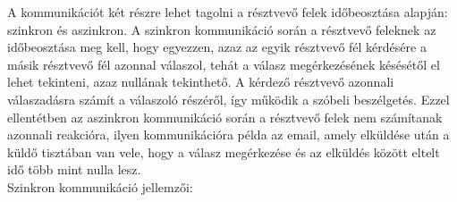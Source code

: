 
A kommunikációt két részre lehet tagolni a résztvevő felek időbeosztása alapján: szinkron és aszinkron. A szinkron kommunikáció során a résztvevő feleknek az időbeosztása meg kell, hogy egyezzen, azaz az egyik résztvevő fél kérdésére a másik résztvevő fél azonnal válaszol, tehát a válasz megérkezésének késésétől el lehet tekinteni, azaz nullának tekinthető. A kérdező résztvevő azonnali válaszadásra számít a válaszoló részéről, így működik a szóbeli beszélgetés. Ezzel ellentétben az aszinkron kommunikáció során a résztvevő felek nem számítanak azonnali reakcióra, ilyen kommunikációra példa az email, amely elküldése után a küldő tisztában van vele, hogy a válasz megérkezése és az elküldés között eltelt idő több mint nulla lesz.\\
\newline
Szinkron kommunikáció jellemzői:

